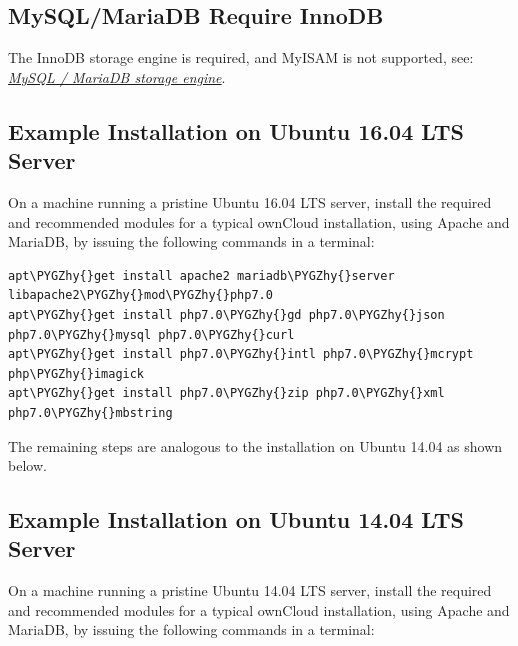 \documentclass[letterpaper,10pt,english]{sphinxmanual}
\def\PYGZhy{\char`\-}
\begin{document}
\subsection{MySQL/MariaDB Require InnoDB}
\label{installation/source_installation:mysql-mariadb-require-innodb}
The InnoDB storage engine is required, and MyISAM is not supported, see: {\hyperref[configuration_database/linux_database_configuration:db\string-storage\string-engine\string-label]{\emph{MySQL / MariaDB storage engine}}}.


\subsection{Example Installation on Ubuntu 16.04 LTS Server}
\label{installation/source_installation:example-installation-on-ubuntu-16-04-lts-server}\label{installation/source_installation:ubuntu-installation-label}
On a machine running a pristine Ubuntu 16.04 LTS server, install the
required and recommended modules for a typical ownCloud installation, using
Apache and MariaDB, by issuing the following commands in a terminal:

\begin{Verbatim}[commandchars=\\\{\}]
apt\PYGZhy{}get install apache2 mariadb\PYGZhy{}server libapache2\PYGZhy{}mod\PYGZhy{}php7.0
apt\PYGZhy{}get install php7.0\PYGZhy{}gd php7.0\PYGZhy{}json php7.0\PYGZhy{}mysql php7.0\PYGZhy{}curl
apt\PYGZhy{}get install php7.0\PYGZhy{}intl php7.0\PYGZhy{}mcrypt php\PYGZhy{}imagick
apt\PYGZhy{}get install php7.0\PYGZhy{}zip php7.0\PYGZhy{}xml php7.0\PYGZhy{}mbstring
\end{Verbatim}

The remaining steps are analogous to the installation on Ubuntu 14.04 as shown below.


\subsection{Example Installation on Ubuntu 14.04 LTS Server}
\label{installation/source_installation:example-installation-on-ubuntu-14-04-lts-server}
On a machine running a pristine Ubuntu 14.04 LTS server, install the
required and recommended modules for a typical ownCloud installation, using
Apache and MariaDB, by issuing the following commands in a terminal:
\end{document}
